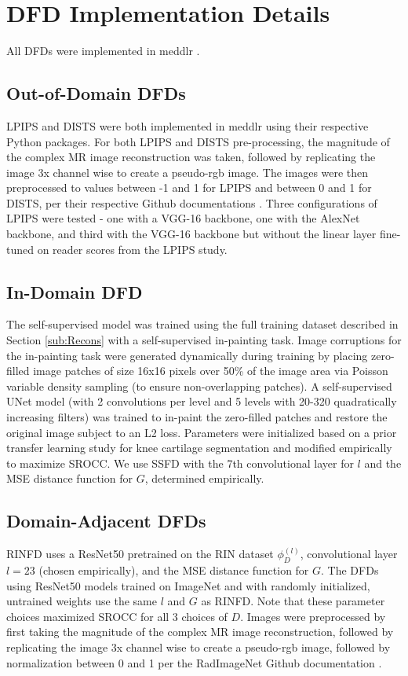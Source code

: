\documentclass[AMA,STIX2COL,Linenumberson]{MRM}
\begin{document}
\section{DFD Implementation Details}
All DFDs were implemented in meddlr \cite{desai2023noise2recon}.

\subsection{Out-of-Domain DFDs}\label{App:DFD_Out}
LPIPS and DISTS were both implemented in meddlr using their respective Python packages. For both LPIPS and DISTS pre-processing, the magnitude of the complex MR image reconstruction was taken, followed by replicating the image 3x channel wise to create a pseudo-rgb image. The images were then preprocessed to values between -1 and 1 for LPIPS and between 0 and 1 for DISTS, per their respective Github documentations \cite{zhang2018unreasonable, ding2020image}. Three configurations of LPIPS were tested - one with a VGG-16 backbone, one with the AlexNet backbone, and third with the VGG-16 backbone but without the linear layer fine-tuned on reader scores from the LPIPS study. 

\subsection{In-Domain DFD}\label{App:DFD_In}
 The self-supervised model was trained using the full training dataset described in Section \ref{sub:Recons}  with a self-supervised in-painting task. Image corruptions for the in-painting task were generated dynamically during training by placing zero-filled image patches of size 16x16 pixels over 50\% of the image area via Poisson variable density sampling (to ensure non-overlapping patches).  A self-supervised UNet model (with 2 convolutions per level and 5 levels with 20-320 quadratically increasing filters) was trained to in-paint the zero-filled patches and restore the original image subject to an L2 loss. Parameters were initialized based on a prior transfer learning study for knee cartilage segmentation \cite{dominic2023improving} and modified empirically to maximize SROCC. We use SSFD with the 7th convolutional layer for $l$ and the MSE distance function for $G$, determined empirically.


\subsection{Domain-Adjacent DFDs}\label{App:DomainAdjacent}
RINFD uses a ResNet50 pretrained on the RIN dataset $\phi_D^{(l)}$, convolutional layer $l=23$ (chosen empirically), and the MSE distance function for $G$. The DFDs using ResNet50 models trained on ImageNet and with randomly initialized, untrained weights use the same $l$ and $G$ as RINFD. Note that these parameter choices maximized SROCC for all 3 choices of $D$. Images were preprocessed by first taking the magnitude of the complex MR image reconstruction, followed by replicating the image 3x channel wise to create a pseudo-rgb image, followed by normalization between 0 and 1 per the RadImageNet Github documentation \cite{mei2022radimagenet}.
\end{document}
